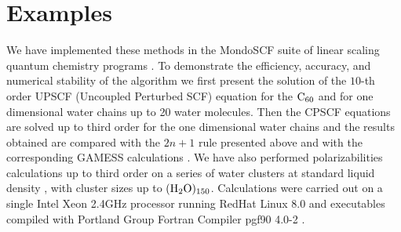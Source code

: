 \documentclass[prl,aps,twocolumn,showpacs,twocolumngrid,superbib]{revtex4}
\begin{document}
\section{Examples}
We have implemented these methods in the MondoSCF suite of linear 
scaling quantum chemistry programs \cite{MondoSCF}.
To demonstrate the efficiency, accuracy, and numerical stability 
of the algorithm we first present
the solution of the $10$-th order UPSCF (Uncoupled Perturbed SCF) 
equation for the $\rm C_{60}$ and for one dimensional water chains up to
20 water molecules. 
Then the CPSCF equations are solved up to third order for the one dimensional 
water chains and the results obtained are compared with the $2n+1$ rule presented 
above and with the corresponding GAMESS calculations \cite{gamess}. We have also 
performed polarizabilities calculations up to third order on a series of water 
clusters at standard liquid density \cite{MChallacombe97,ESchwegler97}, with 
cluster sizes up to $(\rm H_2O)_{150}$. 
Calculations were carried out on a single Intel Xeon 2.4GHz processor 
running RedHat Linux 8.0 and  executables compiled
with Portland Group Fortran Compiler pgf90 4.0-2 \cite{PGF90}.
\end{document}
